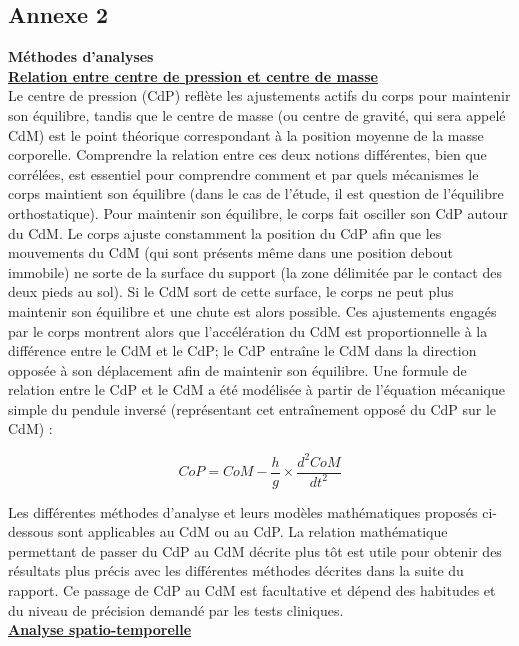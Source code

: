 \newpage
\subsection{Annexe 2}


\textbf{Méthodes d’analyses}\\ 



\textbf{\underline{Relation entre centre de pression et centre de masse}}\\

Le centre de pression (CdP) reflète les ajustements actifs du corps pour maintenir son équilibre, tandis que le centre de masse (ou centre de gravité, qui sera appelé CdM) est le point théorique correspondant à la position moyenne de la masse corporelle.
Comprendre la relation entre ces deux notions différentes, bien que corrélées, est essentiel pour comprendre comment et par quels mécanismes le corps maintient son équilibre (dans le cas de l'étude, il est question de l'équilibre orthostatique).
Pour maintenir son équilibre, le corps fait osciller son CdP autour du CdM. 
Le corps ajuste constamment la position du CdP afin que les mouvements du CdM (qui sont présents même dans une position debout immobile) ne sorte de la surface du support (la zone délimitée par le contact des deux pieds au sol). 
Si le CdM sort de cette surface, le corps ne peut plus maintenir son équilibre et une chute est alors possible.
Ces ajustements engagés par le corps montrent alors que l'accélération du CdM est proportionnelle à la différence entre le CdM et le CdP; le CdP entraîne le CdM dans la direction opposée à son déplacement afin de maintenir son équilibre.
Une formule de relation entre le CdP et le CdM a été modélisée à partir de l'équation mécanique simple du pendule inversé (représentant cet entraînement opposé du CdP sur le CdM) : 

\[
    CoP = CoM - \frac{h}{g} \times \frac{d^2 CoM}{dt^2} \tag{1}
\]

Les différentes méthodes d'analyse et leurs modèles mathématiques proposés ci-dessous sont applicables au CdM ou au CdP.
La relation mathématique permettant de passer du CdP au CdM décrite plus tôt est utile pour obtenir des résultats plus précis avec les différentes méthodes décrites dans la suite du rapport.
Ce passage de CdP au CdM est facultative et dépend des habitudes et du niveau de précision demandé par les tests cliniques.\\

\textbf{\underline{Analyse spatio-temporelle}}\\


